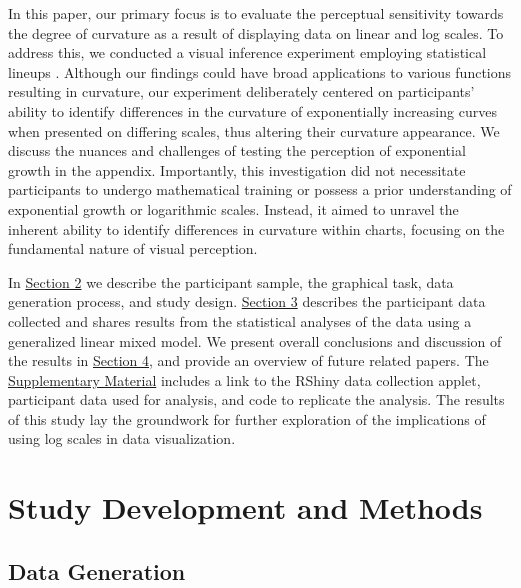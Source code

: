 \documentclass[12pt]{article}
\begin{document}
In this paper, our primary focus is to evaluate the perceptual
sensitivity towards the degree of curvature as a result of displaying
data on linear and log scales. To address this, we conducted a visual
inference experiment employing statistical lineups
\citep{buja_statistical_2009}. Although our findings could have broad
applications to various functions resulting in curvature, our experiment
deliberately centered on participants' ability to identify differences
in the curvature of exponentially increasing curves when presented on
differing scales, thus altering their curvature appearance. We discuss
the nuances and challenges of testing the perception of exponential
growth in the appendix. Importantly, this investigation did not
necessitate participants to undergo mathematical training or possess a
prior understanding of exponential growth or logarithmic scales.
Instead, it aimed to unravel the inherent ability to identify
differences in curvature within charts, focusing on the fundamental
nature of visual perception.

In \hyperref[methods]{Section 2} we describe the participant sample, the
graphical task, data generation process, and study design.
\hyperref[results]{Section 3} describes the participant data collected
and shares results from the statistical analyses of the data using a
generalized linear mixed model. We present overall conclusions and
discussion of the results in \hyperref[conclusion-discussion]{Section
4}, and provide an overview of future related papers. The
\hyperref[supplementary-material]{Supplementary Material} includes a
link to the RShiny data collection applet, participant data used for
analysis, and code to replicate the analysis. The results of this study
lay the groundwork for further exploration of the implications of using
log scales in data visualization.

\section{Study Development and Methods}\label{methods}

\subsection{Data Generation}\label{data-generation}
\end{document}
